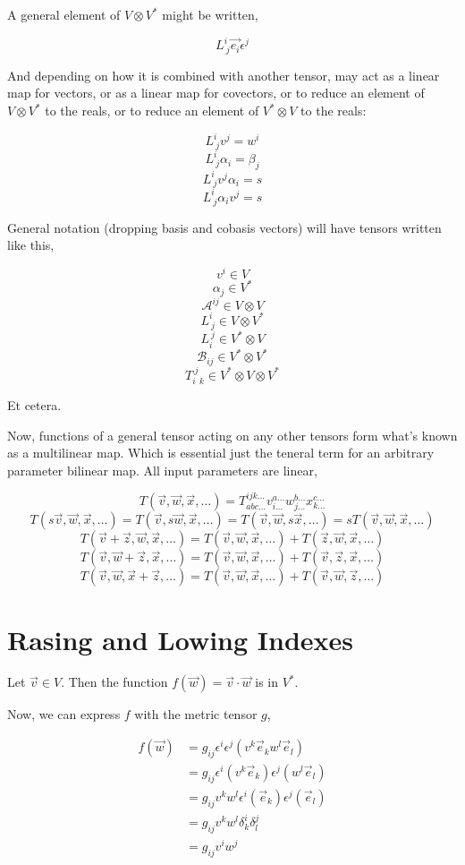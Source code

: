 \documentclass[12pt]{book}
\theoremstyle{plain}
\theoremstyle{definition}
\theoremstyle{ppart}
\theoremstyle{case}
\theoremstyle{solution}
\begin{document}
A general element of $V \otimes V^*$ might be written,

\[ L^i_{~j} \vec{e_i} \epsilon^j \]

And depending on how it is combined with another tensor, may act as a linear map for vectors, or as a linear map for covectors,
or to reduce an element of $V \otimes V^*$ to the reals, or to reduce an element of $V^* \otimes V$ to the reals:

\[ L^i_{~j} v^j = w^i \]
\[ L^i_{~j} \alpha_i = \beta_j \]
\[ L^i_{~j} v^j \alpha_i = s \]
\[ L^i_{~j} \alpha_i v^j = s \]

General notation (dropping basis and cobasis vectors) will have tensors written like this,

\[ v^i \in V \]
\[ \alpha_j \in V^* \]
\[ \mathcal{A}^{ij} \in V \otimes V \]
\[ L^{i}_{~j} \in V \otimes V^* \]
\[ L^{~j}_{i} \in V^* \otimes V \]
\[ \mathcal{B}_{ij} \in V^* \otimes V^* \]
\[ T^{~j}_{i~~k} \in V^* \otimes V \otimes V^* \]

Et cetera.

Now, functions of a general tensor acting on any other tensors form what's known as a multilinear map. Which is essential just the
teneral term for an arbitrary parameter bilinear map. All input parameters are linear,

\[ T(\vec{v}, \vec{w}, \vec{x}, \dots) = T^{ijk\dots}_{abc\dots} v^{a\dots}_{i\dots} w^{b\dots}_{j\dots} x^{c\dots}_{k\dots} \]
\[ T(s\vec{v}, \vec{w}, \vec{x}, \dots) = T(\vec{v}, s\vec{w}, \vec{x}, \dots) = T(\vec{v}, \vec{w}, s\vec{x}, \dots) = s T(\vec{v}, \vec{w}, \vec{x}, \dots) \]
\[ T(\vec{v}+\vec{z}, \vec{w}, \vec{x}, \dots) = T(\vec{v}, \vec{w}, \vec{x}, \dots) + T(\vec{z}, \vec{w}, \vec{x}, \dots)\]
\[ T(\vec{v}, \vec{w}+\vec{z}, \vec{x}, \dots) = T(\vec{v}, \vec{w}, \vec{x}, \dots) + T(\vec{v}, \vec{z}, \vec{x}, \dots)\]
\[ T(\vec{v}, \vec{w}, \vec{x}+\vec{z}, \dots) = T(\vec{v}, \vec{w}, \vec{x}, \dots) + T(\vec{v}, \vec{w}, \vec{z}, \dots)\]

\chapter{Rasing and Lowing Indexes}

Let $\vec{v} \in V$. Then the function $f(\vec{w}) = \vec{v} \cdot \vec{w}$ is in $V^*$.

Now, we can express $f$ with the metric tensor $g$,

\begin{align*}
  f(\vec{w}) &= g_{ij} \epsilon^i \epsilon^j (v^k \vec{e}_k w^l \vec{e}_l) \\
  &= g_{ij} \epsilon^i (v^k \vec{e}_k) \epsilon^j (w^l \vec{e}_l) \\
  &= g_{ij} v^k w^l \epsilon^i (\vec{e}_k) \epsilon^j (\vec{e}_l) \\
  &= g_{ij} v^k w^l \delta^i_k \delta^j_l \\
  &= g_{ij} v^i w^j \\
\end{align*}
\end{document}
